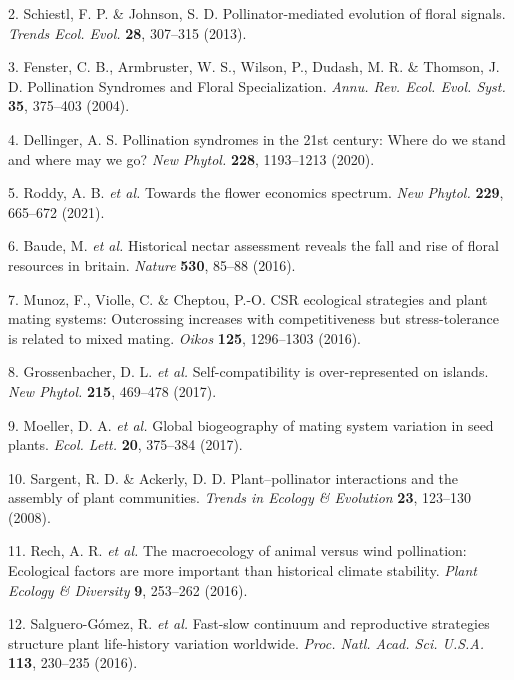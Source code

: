 \documentclass[12pt,a4paper,]{article}
\begin{document}
\hypertarget{ref-schiestl2013}{}
2. Schiestl, F. P. \& Johnson, S. D. Pollinator-mediated evolution of
floral signals. \emph{Trends Ecol. Evol.} \textbf{28}, 307--315 (2013).

\hypertarget{ref-fenster2004}{}
3. Fenster, C. B., Armbruster, W. S., Wilson, P., Dudash, M. R. \&
Thomson, J. D. Pollination Syndromes and Floral Specialization.
\emph{Annu. Rev. Ecol. Evol. Syst.} \textbf{35}, 375--403 (2004).

\hypertarget{ref-dellinger2020}{}
4. Dellinger, A. S. Pollination syndromes in the 21st century: Where do
we stand and where may we go? \emph{New Phytol.} \textbf{228},
1193--1213 (2020).

\hypertarget{ref-roddy2021}{}
5. Roddy, A. B. \emph{et al.} Towards the flower economics spectrum.
\emph{New Phytol.} \textbf{229}, 665--672 (2021).

\hypertarget{ref-baude2016}{}
6. Baude, M. \emph{et al.} Historical nectar assessment reveals the fall
and rise of floral resources in britain. \emph{Nature} \textbf{530},
85--88 (2016).

\hypertarget{ref-munoz2016}{}
7. Munoz, F., Violle, C. \& Cheptou, P.-O. CSR ecological strategies and
plant mating systems: Outcrossing increases with competitiveness but
stress-tolerance is related to mixed mating. \emph{Oikos} \textbf{125},
1296--1303 (2016).

\hypertarget{ref-grossenbacher2017}{}
8. Grossenbacher, D. L. \emph{et al.} Self-compatibility is
over-represented on islands. \emph{New Phytol.} \textbf{215}, 469--478
(2017).

\hypertarget{ref-moeller2017}{}
9. Moeller, D. A. \emph{et al.} Global biogeography of mating system
variation in seed plants. \emph{Ecol. Lett.} \textbf{20}, 375--384
(2017).

\hypertarget{ref-sargent2008}{}
10. Sargent, R. D. \& Ackerly, D. D. Plant--pollinator interactions and
the assembly of plant communities. \emph{Trends in Ecology \& Evolution}
\textbf{23}, 123--130 (2008).

\hypertarget{ref-rech2016}{}
11. Rech, A. R. \emph{et al.} The macroecology of animal versus wind
pollination: Ecological factors are more important than historical
climate stability. \emph{Plant Ecology \& Diversity} \textbf{9},
253--262 (2016).

\hypertarget{ref-salguero2016}{}
12. Salguero-Gómez, R. \emph{et al.} Fast-slow continuum and
reproductive strategies structure plant life-history variation
worldwide. \emph{Proc. Natl. Acad. Sci. U.S.A.} \textbf{113}, 230--235
(2016).
\end{document}
